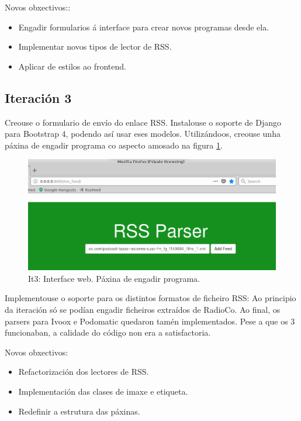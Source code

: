 Novos obxectivos:: 

\begin{itemize}
	\item Engadir formularios á interface para crear novos programas desde ela.
	\item Implementar novos tipos de lector de RSS.
	\item Aplicar  de estilos ao frontend. 
\end{itemize}

\subsection{Iteración 3}

Creouse o formulario de envío do enlace RSS. Instalouse o soporte de Django para Bootstrap 4, podendo así usar eses modelos. Utilizándoos, creouse unha páxina de engadir programa co aspecto amosado na figura \ref{fig:it3_add_program}.

\begin{figure}[h]
	\centering
	\includegraphics[scale=0.5,keepaspectratio=true]{./images/it3_add_program.png}
	\caption{It3: Interface web. Páxina de engadir programa.}
	\label{fig:it3_add_program}
\end{figure}

Implementouse o soporte para os distintos formatos de ficheiro RSS: Ao principio da iteración só se podían engadir ficheiros extraídos de RadioCo. Ao final, os parsers para Ivoox e Podomatic quedaron tamén implementados. Pese a que os 3 funcionaban, a calidade do código non era a satisfactoria.

Novos obxectivos:

\begin{itemize}
	\item Refactorización dos lectores de RSS.
	\item Implementación das clases de imaxe e etiqueta.
	\item Redefinir a estrutura das páxinas. 
\end{itemize}


